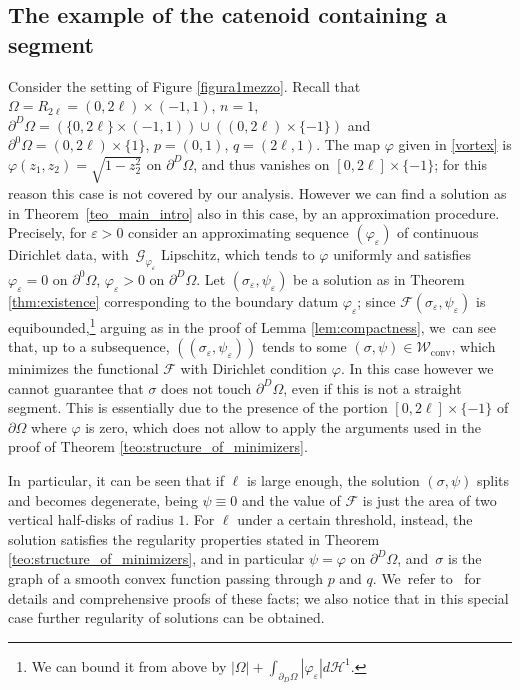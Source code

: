 \documentclass[11pt]{article}
\numberwithin{equation}{section}
\let\eps\varepsilon
\let\Om\Omega
\newcommand\admclassconv{{\mathcal W_\mathrm{conv}}}
\theoremstyle{definition}
\begin{document}
\subsection{The example of the catenoid containing a segment}
\label{subsec:the_example_of_the_catenoid_containing_a_segment}
Consider the setting of
Figure \ref{figura1mezzo}. Recall that
$\Omega=R_{2\ell}=(0,2\ell)\times (-1,1)$,
$n=1$, $\partial^D\Om=(\{0,2\ell\}\times (-1,1))\cup ((0,2\ell)\times \{-1\})$ and $\partial^0\Om=(0,2\ell)\times \{1\}$, $p=(0,1)$, $q=(2\ell,1)$.
The map $\varphi$ given in \eqref{vortex} is $\varphi(z_1,z_2)=\sqrt{1-z_2^2}$ on $\partial^D
\Om$, and thus
vanishes on $[0,2\ell]\times \{-1\}$; for this reason this case is not covered by our analysis. However we can find a solution as in Theorem~\ref{teo_main_intro} also in this case, by an approximation procedure.
Precisely, for $\eps>0$ consider an approximating sequence $(\varphi_\eps)$ of continuous Dirichlet data, with~$\mathcal G_{\varphi_\eps}$ Lipschitz, which tends to $\varphi$ uniformly and satisfies $\varphi_\eps=0$ on $\partial^0\Om$, $\varphi_\eps>0$ on $\partial^D\Om$. Let $(\sigma_\eps,\psi_\eps)$ be a solution as in Theorem \ref{thm:existence} corresponding to the boundary datum $\varphi_\eps$; since $\mathcal F(\sigma_\eps,\psi_\eps)$ is equibounded,\footnote{We can bound it from above by $|\Om|+\int_{\partial_D\Om}|\varphi_\eps|d\mathcal H^1$.} arguing as in the proof of Lemma \ref{lem:compactness}, we~can see that, up to
a subsequence, $((\sigma_\eps,\psi_\eps))$ tends to some $(\sigma,\psi)\in \admclassconv$, which minimizes the functional $\mathcal F$ with Dirichlet condition $\varphi$.
In this case however we cannot guarantee that $\sigma$ does not touch $\partial^D\Om$, even if this is not a straight segment.
This is essentially due to the presence of the
portion $[0,2\ell]\times \{-1\}$ of $\partial \Om$
where $\varphi$ is zero, which does not allow to apply the arguments used in the proof of Theorem \ref{teo:structure_of_minimizers}.\enlargethispage{2pt}

In~particular, it can be seen that if $\ell$ is large enough,
the solution $(\sigma,\psi)$ splits and becomes degenerate,
being $\psi\equiv0$ and the value of $\mathcal F$ is
just the area of two vertical half-disks of radius $1$. For $\ell$ under a certain threshold, instead, the solution satisfies the regularity properties stated in Theorem \ref{teo:structure_of_minimizers}, and in particular $\psi=\varphi$ on $\partial^D\Omega$, and~$\sigma$ is the graph of a smooth convex function passing through $p$ and $q$. We~refer to~\cite{BES2} for details and comprehensive proofs of these facts;
we also notice that in this special case further regularity of solutions
can be obtained.
\end{document}
